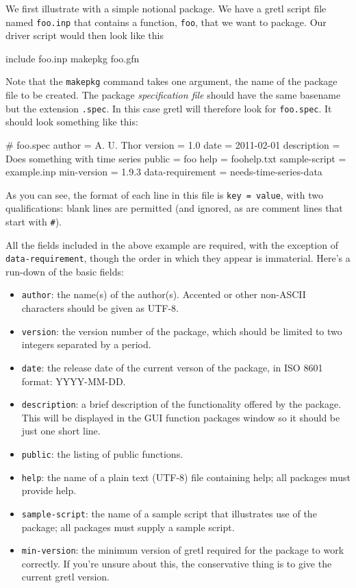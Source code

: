 We first illustrate with a simple notional package. We have a gretl
script file named \texttt{foo.inp} that contains a function,
\texttt{foo}, that we want to package. Our driver script would then
look like this
%
\begin{code}
include foo.inp
makepkg foo.gfn
\end{code}
%
Note that the \texttt{makepkg} command takes one argument, the name of
the package file to be created. The package \emph{specification file}
should have the same basename but the extension \texttt{.spec}. In
this case gretl will therefore look for \texttt{foo.spec}. It
should look something like this:
%
\begin{code}
# foo.spec
author = A. U. Thor
version = 1.0
date = 2011-02-01
description = Does something with time series
public = foo 
help = foohelp.txt
sample-script = example.inp
min-version = 1.9.3
data-requirement = needs-time-series-data
\end{code}

As you can see, the format of each line in this file is \texttt{key =
  value}, with two qualifications: blank lines are permitted (and
ignored, as are comment lines that start with \verb|#|). 

All the fields included in the above example are required, with the
exception of \texttt{data-requirement}, though the order in which they
appear is immaterial. Here's a run-down of the basic fields:

\begin{itemize}
\item \texttt{author}: the name(s) of the author(s). Accented or other
  non-ASCII characters should be given as UTF-8.
\item \texttt{version}: the version number of the package, which should
  be limited to two integers separated by a period.
\item \texttt{date}: the release date of the current verson of the
  package, in ISO 8601 format: YYYY-MM-DD.
\item \texttt{description}: a brief description of the functionality
  offered by the package. This will be displayed in the GUI function
  packages window so it should be just one short line.
\item \texttt{public}: the listing of public functions.
\item \texttt{help}: the name of a plain text (UTF-8) file containing
  help; all packages must provide help.
\item \texttt{sample-script}: the name of a sample script that
 illustrates use of the package; all packages must supply a
 sample script.
\item \texttt{min-version}: the minimum version of gretl required
 for the package to work correctly. If you're unsure about this,
 the conservative thing is to give the current gretl version.
\end{itemize}


